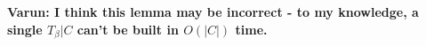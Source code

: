 \documentclass[final,1p,times]{elsarticle}
\newcommand{\TB}{T_\beta}
\newtheorem{lemma}[theorem]{Lemma}
\begin{document}
	{\bf Varun: I think this lemma may be incorrect - to my knowledge, a single $\TB|C$ can't be built in $O(|C|)$ time.}


%

    \newpage
\end{document}
